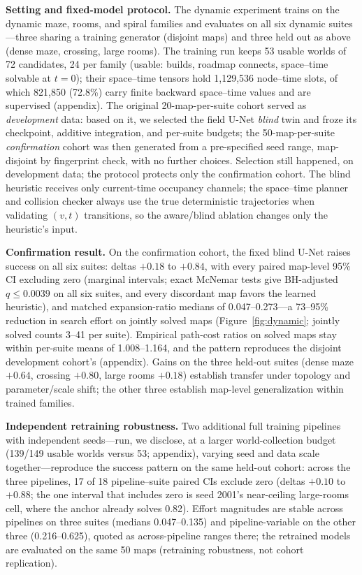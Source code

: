 \documentclass[letterpaper]{article} %
\begin{document}
\textbf{Setting and fixed-model protocol.} The dynamic experiment trains on the dynamic maze, rooms, and spiral families and evaluates on all six dynamic suites---three sharing a training generator (disjoint maps) and three held out as above (dense maze, crossing, large rooms). The training run keeps 53 usable worlds of 72 candidates, 24 per family (usable: builds, roadmap connects, space--time solvable at $t{=}0$); their space--time tensors hold 1{,}129{,}536 node--time slots, of which 821{,}850 (72.8\%) carry finite backward space--time values and are supervised (appendix). The original 20-map-per-suite cohort served as \emph{development} data: based on it, we selected the field U-Net \emph{blind} twin and froze its checkpoint, additive integration, and per-suite budgets; the 50-map-per-suite \emph{confirmation} cohort was then generated from a pre-specified seed range, map-disjoint by fingerprint check, with no further choices. Selection still happened, on development data; the protocol protects only the confirmation cohort. The blind heuristic receives only current-time occupancy channels; the space--time planner and collision checker always use the true deterministic trajectories when validating $(v,t)$ transitions, so the aware/blind ablation changes only the heuristic's input.

\textbf{Confirmation result.} On the confirmation cohort, the fixed blind U-Net raises success on all six suites: deltas $+0.18$ to $+0.84$, with every paired map-level 95\% CI excluding zero (marginal intervals; exact McNemar tests give BH-adjusted $q \leq 0.0039$ on all six suites, and every discordant map favors the learned heuristic), and matched expansion-ratio medians of 0.047--0.273---a 73--95\% reduction in search effort on jointly solved maps (Figure~\ref{fig:dynamic}; jointly solved counts 3--41 per suite). Empirical path-cost ratios on solved maps stay within per-suite means of 1.008--1.164, and the pattern reproduces the disjoint development cohort's (appendix). Gains on the three held-out suites (dense maze $+0.64$, crossing $+0.80$, large rooms $+0.18$) establish transfer under topology and parameter/scale shift; the other three establish map-level generalization within trained families.

\textbf{Independent retraining robustness.} Two additional full training pipelines with independent seeds---run, we disclose, at a larger world-collection budget (139/149 usable worlds versus 53; appendix), varying seed and data scale together---reproduce the success pattern on the same held-out cohort: across the three pipelines, 17 of 18 pipeline--suite paired CIs exclude zero (deltas $+0.10$ to $+0.88$; the one interval that includes zero is seed 2001's near-ceiling large-rooms cell, where the anchor already solves 0.82). Effort magnitudes are stable across pipelines on three suites (medians 0.047--0.135) and pipeline-variable on the other three (0.216--0.625), quoted as across-pipeline ranges there; the retrained models are evaluated on the same 50 maps (retraining robustness, not cohort replication).
\end{document}
